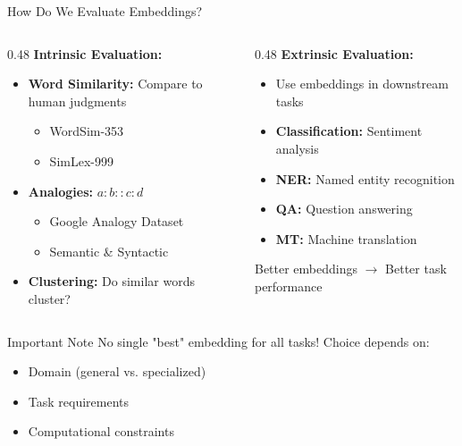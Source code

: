\documentclass[aspectratio=169]{beamer}
\begin{document}
\begin{frame}[shrink=10]{How Do We Evaluate Embeddings? 📏}
\small
\begin{columns}[T]
\begin{column}{0.48\textwidth}
\textbf{Intrinsic Evaluation:}
\begin{itemize}\setlength{\itemsep}{0pt}
    \item \textbf{Word Similarity:} Compare to human judgments
    \begin{itemize}\setlength{\itemsep}{0pt}
        \item WordSim-353
        \item SimLex-999
    \end{itemize}
    \item \textbf{Analogies:} $a:b :: c:d$
    \begin{itemize}\setlength{\itemsep}{0pt}
        \item Google Analogy Dataset
        \item Semantic \& Syntactic
    \end{itemize}
    \item \textbf{Clustering:} Do similar words cluster?
\end{itemize}
\end{column}

\begin{column}{0.48\textwidth}
\textbf{Extrinsic Evaluation:}
\begin{itemize}\setlength{\itemsep}{0pt}
    \item Use embeddings in downstream tasks
    \item \textbf{Classification:} Sentiment analysis
    \item \textbf{NER:} Named entity recognition
    \item \textbf{QA:} Question answering
    \item \textbf{MT:} Machine translation
\end{itemize}

\vspace{1em}
\alert{Better embeddings $\rightarrow$ Better task performance}
\end{column}
\end{columns}

\vspace{1em}

\begin{block}{Important Note}
No single "best" embedding for all tasks! Choice depends on:
\begin{itemize}\setlength{\itemsep}{0pt}
    \item Domain (general vs. specialized)
    \item Task requirements
    \item Computational constraints
\end{itemize}
\end{block}
\end{frame}
\end{document}
